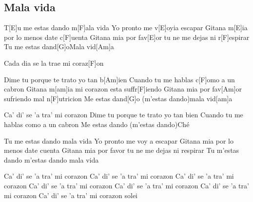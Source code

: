\subsection*{Mala vida   }
\begin{guitar}
T[E]u me estas dando m[F]ala vida
Yo pronto me v[E]oyi\qquad   [F]a escapar
Gitana m[E]ia por lo menos date c[F]uenta
Gitana mia por fav[E]or tu ne me dejas ni r[F]espirar
Tu me estas dand[G]o\qquad      Mala vid[Am]a



Cada dia se la trae mi coraz[F]on



Dime tu porque te trato yo tan b[Am]ien
Cuando tu me hablas c[F]omo a un cabron
Gitana m[am]ia mi corazon esta suffr[F]iendo
Gitana mia por fav[Am]or sufriendo mal n[F]utricion
Me estas dand[G]o  (m'estas dando)\qquad    mala vid[am]a



Ca' di' se 'a tra' mi corazon
Dime tu porque te trato yo tan bien
Cuando tu me hablas como a un cabron
Me estas dando  (m'estas dando)\qquad    Ché



Tu me estas dando mala vida
Yo pronto me voy   a escapar
Gitana mia por lo menos date cuenta
Gitana mia por favor tu ne me dejas ni respirar
Tu m'estas dando  m'estas dando    mala vida



Ca' di' se 'a tra' mi corazon \qquad Ca' di' se 'a tra' mi corazon
Ca' di' se 'a tra' mi corazon \qquad Ca' di' se 'a tra' mi corazon
Ca' di' se 'a tra' mi corazon \qquad Ca' di' se 'a tra' mi corazon
Ca' di' se 'a tra' mi corazon \qquad solei
\end{guitar}
